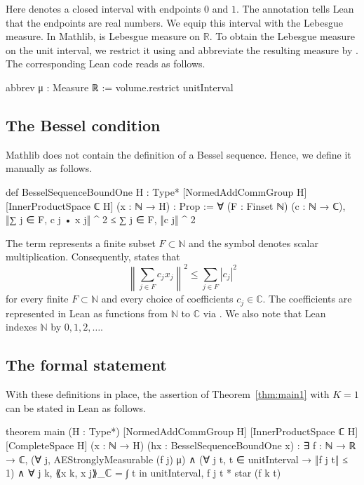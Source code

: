 \documentclass[reqno,a4paper,12pt]{amsart}
\numberwithin{equation}{section}
\def\N{{\mathbb N}}
\def\C{{\mathbb C}}
\newcommand\1{\mathds{1}}
\begin{document}
Here  denotes a closed interval with endpoints $0$ and $1$. The annotation  tells Lean that the endpoints are real numbers. We equip this interval with the Lebesgue measure. In Mathlib,  is Lebesgue measure on $\mathbb{R}$. To obtain the Lebesgue measure on the unit interval, we restrict it using  and abbreviate the resulting measure by . The corresponding Lean code reads as follows.

\begin{leancode}
abbrev μ : Measure ℝ :=
  volume.restrict unitInterval
\end{leancode}

\subsection{The Bessel condition}

Mathlib does not contain the definition of a Bessel sequence. Hence, we define it manually as follows.

\begin{leancode}
def BesselSequenceBoundOne
    {H : Type*} [NormedAddCommGroup H] [InnerProductSpace ℂ H]
    (x : ℕ → H) : Prop :=
    ∀ (F : Finset ℕ) (c : ℕ → ℂ),
      ‖∑ j ∈ F, c j • x j‖ ^ 2 ≤ ∑ j ∈ F, ‖c j‖ ^ 2
\end{leancode}

The term  represents a finite subset $F\subset\mathbb{N}$ and the symbol  denotes scalar multiplication. Consequently,  states
that
$$
    \left\|\sum_{j\in F}c_jx_j\right\|^2
    \leq
    \sum_{j\in F}|c_j|^2
$$
for every finite $F\subset\mathbb{N}$ and every choice of coefficients $c_j \in \C$. The coefficients are represented in Lean as functions from $\N$ to $\C$ via . We also note that Lean indexes $\mathbb{N}$ by $0,1,2,\ldots$.

\subsection{The formal statement}

With these definitions in place, the assertion of
Theorem~\ref{thm:main1} with $K=1$ can be stated in Lean as follows.

\begin{leancode}
theorem main
    (H : Type*) [NormedAddCommGroup H] [InnerProductSpace ℂ H] [CompleteSpace H]
    (x : ℕ → H) (hx : BesselSequenceBoundOne x) :
    ∃ f : ℕ → ℝ → ℂ,
      (∀ j, AEStronglyMeasurable (f j) μ) ∧
      (∀ j t, t ∈ unitInterval → ‖f j t‖ ≤ 1) ∧
      ∀ j k, ⟪x k, x j⟫_ℂ = ∫ t in unitInterval, f j t * star (f k t)
\end{leancode}
\end{document}

